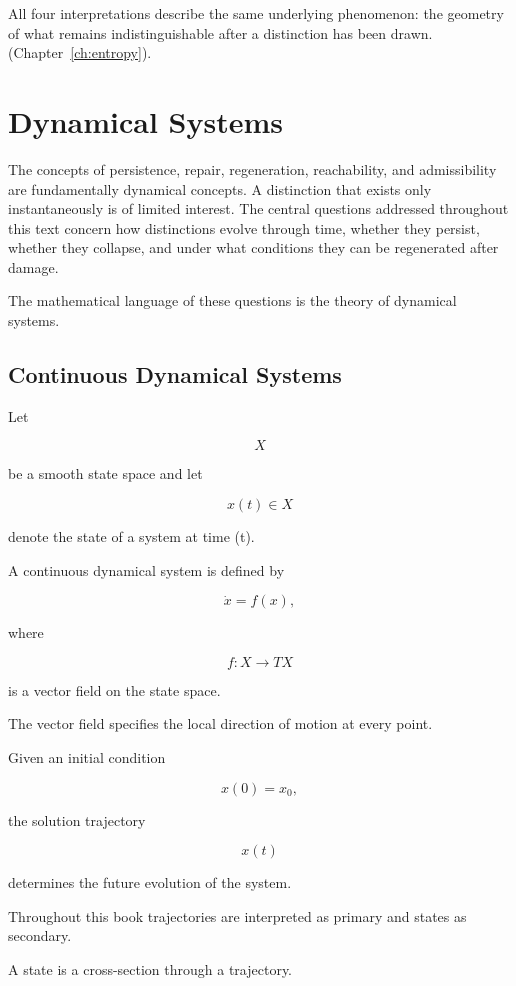 \documentclass[12pt,twoside,openright]{book}
\begin{document}
All four interpretations describe the same underlying
phenomenon: the geometry of what remains indistinguishable
after a distinction has been drawn.
(Chapter~\ref{ch:entropy}).

\section{Dynamical Systems}

The concepts of persistence, repair, regeneration,
reachability, and admissibility are fundamentally
dynamical concepts. A distinction that exists only
instantaneously is of limited interest. The central
questions addressed throughout this text concern how
distinctions evolve through time, whether they persist,
whether they collapse, and under what conditions they can
be regenerated after damage.

The mathematical language of these questions is the theory
of dynamical systems.

\subsection{Continuous Dynamical Systems}

Let

\[
X
\]

be a smooth state space and let

\[
x(t)\in X
\]

denote the state of a system at time (t).

A continuous dynamical system is defined by

\[
\dot{x}
=

f(x),
\]

where

\[
f:X\rightarrow TX
\]

is a vector field on the state space.

The vector field specifies the local direction of motion
at every point.

Given an initial condition

\[
x(0)=x_0,
\]

the solution trajectory

\[
x(t)
\]

determines the future evolution of the system.

Throughout this book trajectories are interpreted as
primary and states as secondary.

A state is a cross-section through a trajectory.
\end{document}
